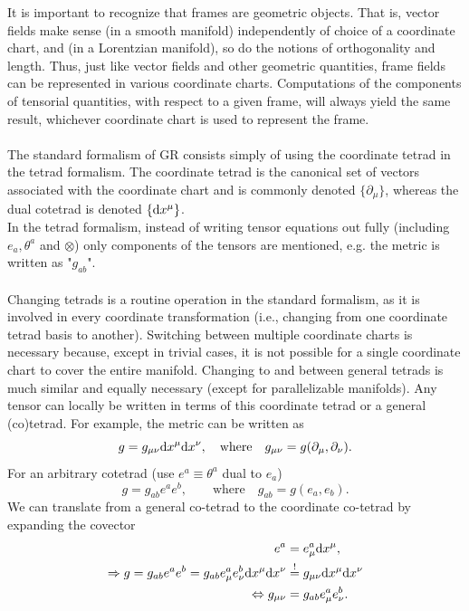 It is important to recognize that frames are geometric objects. That is, vector fields make sense (in a smooth manifold) independently of choice of a coordinate chart, and (in a Lorentzian manifold), so do the notions of orthogonality and length. Thus, just like vector fields and other geometric quantities, frame fields can be represented in various coordinate charts. Computations of the components of tensorial quantities, with respect to a given frame, will always yield the same result, whichever coordinate chart is used to represent the frame.\\
\\ 
The standard formalism of GR consists simply of using the coordinate tetrad in the tetrad formalism. The coordinate tetrad is the canonical set of vectors associated with the coordinate chart and is commonly denoted $\{\partial_{\mu}\}$, whereas the dual cotetrad is denoted $\{\mathrm{d} x^{\mu} \}$.\\
In the tetrad formalism, instead of writing tensor equations out fully (including $e_a,\theta^a$ and $\otimes$) only components of the tensors are mentioned, e.g. the metric is written as "$g_{ab}$".\\
\\
Changing tetrads is a routine operation in the standard formalism, as it is involved in every coordinate transformation (i.e., changing from one coordinate tetrad basis to another). Switching between multiple coordinate charts is necessary because, except in trivial cases, it is not possible for a single coordinate chart to cover the entire manifold. Changing to and between general tetrads is much similar and equally necessary (except for parallelizable manifolds). Any tensor can locally be written in terms of this coordinate tetrad or a general (co)tetrad. For example, the metric can be written as
\begin{equation}
	g=g_{\mu \nu} \mathrm{d} x^{\mu} \mathrm{d} x^{\nu}, \quad \mathrm{where} \quad g_{\mu \nu} = g(\partial_{\mu},\partial_{\nu}).
\end{equation}
For an arbitrary cotetrad (use $e^a \equiv \theta^a$ dual to $e_a$)
\begin{equation}
	g=g_{ab} e^a e^b, \qquad \mathrm{where} \quad g_{ab} = g(e_a,e_b).
\end{equation}
We can translate from a general co-tetrad to the coordinate co-tetrad by expanding the covector
\begin{align*}
	e^a &= e^a_{\mu} \mathrm{d} x^{\mu},\\
	\Rightarrow g=g_{ab}e^a e^b = g_{ab} e^a_{\mu} e^b_{\nu} \mathrm{d} x^{\mu} \mathrm{d} x^{\nu} &\stackrel{!}{=} g_{\mu \nu} \mathrm{d} x^{\mu} \mathrm{d} x^{\nu} \\
	\Leftrightarrow g_{\mu \nu} &= g_{ab} e^a_{\mu} e^b_{\nu}.
\end{align*}
